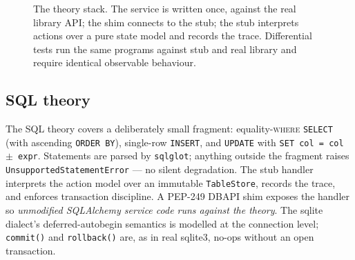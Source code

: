 \documentclass[11pt,a4paper]{article}
\begin{document}
\begin{figure}[t]
\centering
{}
\caption{The theory stack.  The service is written once, against the
real library API; the shim connects to the stub; the stub interprets
actions over a pure state model and records the trace.  Differential
tests run the same programs against stub and real library and require
identical observable behaviour.}
\label{fig:theory-stack}
\end{figure}

\subsection{SQL theory}

The SQL theory covers a deliberately small fragment: equality-\textsc{where}
\texttt{SELECT} (with ascending \texttt{ORDER BY}), single-row
\texttt{INSERT}, and \texttt{UPDATE} with \texttt{SET col = col $\pm$
expr}.  Statements are parsed by \texttt{sqlglot}; anything outside
the fragment raises \texttt{UnsupportedStatementError} --- no silent
degradation.  The stub handler interprets the action model over an
immutable \texttt{TableStore}, records the trace, and enforces
transaction discipline.  A PEP-249 DBAPI shim exposes the handler so
\emph{unmodified SQLAlchemy service code runs against the theory}.
The sqlite dialect's deferred-autobegin semantics is modelled at the
connection level; \texttt{commit()} and \texttt{rollback()} are, as in
real sqlite3, no-ops without an open transaction.
\end{document}
